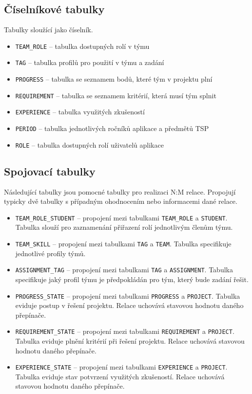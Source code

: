 \documentclass[czech,BP]{thesiskiv}
\begin{document}
		\subsection{Číselníkové tabulky}
		\par Tabulky sloužící jako číselník.
		\begin{itemize}
			\item \texttt{TEAM\_ROLE} -- tabulka dostupných rolí v týmu
			\item \texttt{TAG} -- tabulka profilů pro použití v týmu a zadání
			\item \texttt{PROGRESS} -- tabulka se seznamem bodů, které tým v projektu plní
			\item \texttt{REQUIREMENT} -- tabulka se seznamem kritérií, která musí tým splnit
			\item \texttt{EXPERIENCE} -- tabulka využitých zkušeností
			\item \texttt{PERIOD} -- tabulka jednotlivých ročníků aplikace a předmětů TSP
			\item \texttt{ROLE} -- tabulka dostupných rolí uživatelů aplikace
		\end{itemize}
		\subsection{Spojovací tabulky}
			\par Následující tabulky jsou pomocné tabulky pro realizaci N:M relace. Propojují typicky dvě tabulky s případným ohodnocením nebo informacemi dané relace.
			\begin{itemize}
				\item \texttt{TEAM\_ROLE\_STUDENT} -- propojení mezi tabulkami \texttt{TEAM\_ROLE} a \texttt{STUDENT}. Tabulka slouží pro zaznamenání přiřazení rolí jednotlivým členům týmu.
				\item \texttt{TEAM\_SKILL} -- propojení mezi tabulkami \texttt{TAG} a \texttt{TEAM}. Tabulka specifikuje jednotlivé profily týmů.
				\item \texttt{ASSIGNMENT\_TAG} -- propojení mezi tabulkami \texttt{TAG} a \texttt{ASSIGNMENT}. Tabulka specifikuje jaký profil týmu je předpokládán pro tým, který bude zadání řešit.
				\item \texttt{PROGRESS\_STATE} -- propojení mezi tabulkami \texttt{PROGRESS} a \texttt{PROJECT}. Tabulka eviduje postup v řešení projektu. Relace uchovává stavovou hodnotu daného přepínače.
				\item \texttt{REQUIREMENT\_STATE} -- propojení mezi tabulkami \texttt{REQUIREMENT} a \texttt{PROJECT}. Tabulka eviduje plnění kritérií při řešení projektu. Relace uchovává stavovou hodnotu daného přepínače.
				\item \texttt{EXPERIENCE\_STATE} -- propojení mezi tabulkami \texttt{EXPERIENCE} a \texttt{PROJECT}. Tabulka eviduje stav potvrzení využitých zkušeností. Relace uchovává stavovou hodnotu daného přepínače.
			\end{itemize}
\end{document}
